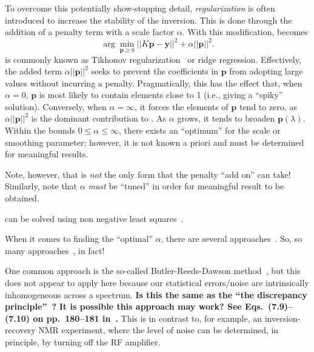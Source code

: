 \documentclass[
  aps,
  prb,
  twocolumn,
  reprint,
  superscriptaddress,
  floatfix,
  citeautoscript,
  longbibliography,
]{revtex4-2}
\newcommand{\latin}[1]{#1}
\begin{document}
To overcome this potentially show-stopping detail, \emph{regularization} is often introduced to increase the stability of the inversion.
This is done through the addition of a penalty term with a scale factor $\alpha$.
With this modification,  becomes
\begin{equation}
\label{eq:rnnls}
   \arg \min_{\mathbf{p} \geq 0} || K \mathbf{p} - \mathbf{y} ||^{2} + \alpha || \mathbf{p} ||^{2} .
\end{equation}
 is commonly known as Tikhonov regularization~\cite{1995-Tikhonov-NMSIPP} or ridge regression.
Effectively, the added term $\alpha || \mathbf{p} ||^{2}$ seeks to prevent the coefficients in $\mathbf{p}$ from adopting large values without incurring a penalty.
Pragmatically, this has the effect that, when $\alpha = 0$, $\mathbf{p}$ is most likely to contain elements close to 1 (\latin{i.e.}, giving a ``spiky'' solution).
Conversely, when $\alpha = \infty$, it forces the elements of $\mathbf{p}$ tend to zero, as $\alpha || \mathbf{p} ||^{2}$ is the dominant contribution to .
As $\alpha$ grows, it tends to broaden $\mathbf{p}(\lambda)$.
Within the bounds $0 \leq \alpha \leq \infty$, there exists an ``optimum'' for the scale or smoothing parameter;
however, it is not known \latin{a priori} and must be determined for meaningful results.




Note, however, that  is \emph{not} the only form that the penalty ``add on'' can take!
Similarly, note that $\alpha$ \emph{must} be ``tuned'' in order for meaningful result to be obtained.


 can be solved using non negative least squares~\cite{1995-Lawson-SLSP}.



When it comes to finding the ``optimal'' $\alpha$, there are several approaches~\cite{2001-Kilmer-SIAMJMAA-22-1204}.
So, so many approaches~\cite{2011-Bauer-MCS-81-1795}, in fact!


One common approach is the so-called Butler-Reeds-Dawson method~\cite{1981-Butler-SIAMJNMA-18-381}, but this does not appear to apply here because our statistical errors/noise are intrinsically inhomogeneous across a spectrum.
\textbf{Is this the same as the ``the discrepancy principle''~\cite{1966-Morozon-DANSSR-167-510}?}
\textbf{It is possible this approach may work? See Eqs.~(7.9)--(7.10) on pp.~180--181 in~\cite{1998-Hansen-RDDIPP}.}
This is in contrast to, for example, an inversion-recovery NMR experiment, where the level of noise can be determined, in principle, by turning off the RF amplifier.
\end{document}
